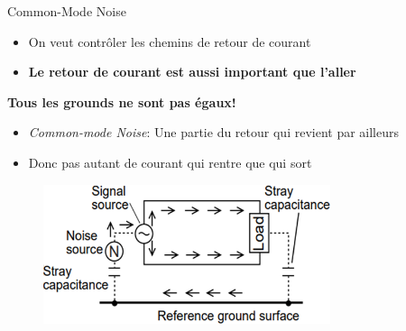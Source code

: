 \begin{frame}{Common-Mode Noise}
    \begin{itemize}
        \item On veut contrôler les chemins de retour de courant
        \item \textbf{Le retour de courant est aussi important que l'aller}
    \end{itemize}
    \begin{center}
        \textcolor{UDSgreenFierte}{\faLongArrowAltRight}
        \textbf{Tous les grounds ne sont pas égaux!}
        \textcolor{UDSgreenFierte}{\faLongArrowAltLeft}
    \end{center}
    \pause
    \begin{itemize}
        \item \textit{Common-mode Noise}: Une partie du retour qui revient par ailleurs
        \item Donc pas autant de courant qui rentre que qui sort
    \end{itemize}
    \vfill
    \begin{figure}
        \includegraphics[width=0.75\textwidth, height=0.5\textheight, keepaspectratio]{pictures/common-mode-noise.png}
    \end{figure}
\end{frame}

